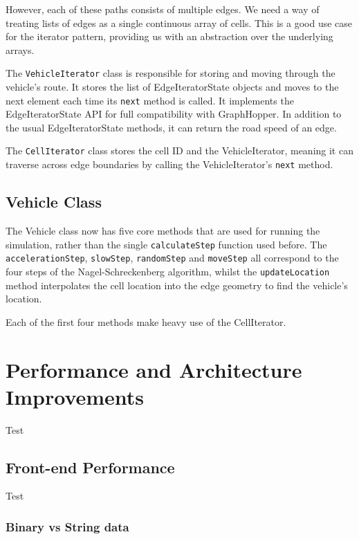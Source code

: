 \documentclass[ %
                    author={Alexander Hill},
                supervisor={Dr. Benjamin Sach},
                    degree={MEng},
                     title={MARMOSET: Multi Agent Real-time Multi-core Online
                     Simulation for Efficient Transportation},
                  subtitle={},
                      type={research},
                      year={2016} ]{dissertation}
\begin{document}
However, each of these paths consists of multiple edges. We need a way of treating
lists of edges as a single continuous array of cells. This is a good use case
for the iterator pattern, providing us with an abstraction over the underlying
arrays.

The \texttt{VehicleIterator} class is responsible for storing and moving through
the vehicle's route. It stores the list of EdgeIteratorState objects and moves
to the next element each time its \texttt{next} method is called. It implements
the EdgeIteratorState API for full compatibility with GraphHopper. In addition
to the usual EdgeIteratorState methods, it can return the road speed of an edge.

The \texttt{CellIterator} class stores the cell ID and the VehicleIterator,
meaning it can traverse across edge boundaries by calling the VehicleIterator's
\texttt{next} method.


\subsection{Vehicle Class}

The Vehicle class now has five core methods that are used for running the
simulation, rather than the single \texttt{calculateStep} function used before.
The \texttt{accelerationStep}, \texttt{slowStep}, \texttt{randomStep} and
\texttt{moveStep} all correspond to the four steps of the Nagel-Schreckenberg
algorithm, whilst the \texttt{updateLocation} method interpolates the cell
location into the edge geometry to find the vehicle's location.

Each of the first four methods make heavy use of the CellIterator.

\section{Performance and Architecture Improvements}

Test

\subsection{Front-end Performance}

Test

\subsubsection{Binary vs String data}
\end{document}
